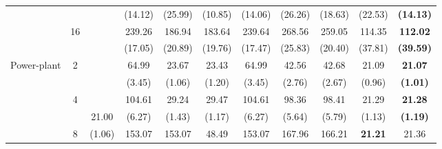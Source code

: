 \documentclass[letterpaper]{article} %
\begin{document}
\begin{table}[!t]
{\begin{tabular}{clcccccccc|cc}
\multicolumn{2}{c}{}                             &                       &                             & (14.12)                   & (25.99)                   & (10.85)                     & (14.06)                   & (26.26)                   & (18.63)                     & (22.53)             & \textbf{(14.13)}      \\
\multicolumn{2}{c}{}                             & \multirow{2}{*}{16}   &                             & 239.26                    & 186.94                    & 183.64                      & 239.64                    & 268.56                    & 259.05                      & 114.35              & \textbf{112.02}       \\
\multicolumn{2}{c}{}                             &                       &                             & (17.05)                   & (20.89)                   & (19.76)                     & (17.47)                   & (25.83)                   & (20.40)                     & (37.81)             & \textbf{(39.59)}      \\ \hline
\multicolumn{2}{c}{\multirow{8}{*}{Power-plant}} & \multirow{2}{*}{2}    &                             & 64.99                     & 23.67                     & 23.43                       & 64.99                     & 42.56                     & 42.68                       & 21.09               & \textbf{21.07}        \\
\multicolumn{2}{c}{}                             &                       &                             & (3.45)                    & (1.06)                    & (1.20)                      & (3.45)                    & (2.76)                    & (2.67)                      & (0.96)              & \textbf{(1.01)}       \\
\multicolumn{2}{c}{}                             & \multirow{2}{*}{4}    &                             & 104.61                    & 29.24                     & 29.47                       & 104.61                    & 98.36                     & 98.41                       & 21.29               & \textbf{21.28}        \\
\multicolumn{2}{c}{}                             &                       & 21.00                       & (6.27)                    & (1.43)                    & (1.17)                      & (6.27)                    & (5.64)                    & (5.79)                      & (1.13)              & \textbf{(1.19)}       \\
\multicolumn{2}{c}{}                             & \multirow{2}{*}{8}    & (1.06)                      & 153.07                    & 153.07                    & 48.49                       & 153.07                    & 167.96                    & 166.21                      & \textbf{21.21}      & 21.36                 \\

\end{tabular}}
\end{table}
\end{document}
